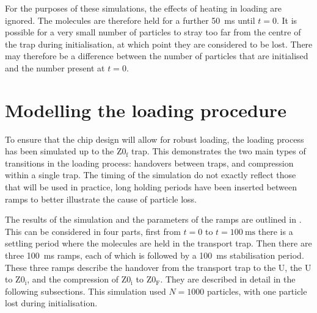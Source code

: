 For the purposes of these simulations, the effects of heating in loading
  are
ignored. The molecules are therefore held for a further \SI{50}{\milli\second}
until $t=0$. It is possible for a very small number of particles to stray too
far from the centre of the trap during initialisation, at which point they are
considered to be lost. There may therefore be a difference between the number
of particles that are initialised and the number present at $t=0$.

\section{Modelling the loading procedure}
\label{design:sim}

To ensure that the chip design will allow for robust loading, the loading
process has been simulated up to the $\mathrm{Z0_f}$ trap. This demonstrates
the two main types of transitions in the loading process: handovers between
traps, and compression within a single trap. The timing of the simulation do
not exactly reflect those that will be used in practice, long holding periods
have been inserted between ramps to better illustrate the cause of particle
loss.

The results of the simulation and the parameters of the ramps are outlined in
. This can be considered in four parts, first
from $t = 0$ to $t=\SI{100}{\milli\second}$ there is a settling period where
the molecules are held in the transport trap. Then there are three
\SI{100}{\milli\second} ramps, each of which is followed by a
\SI{100}{\milli\second} stabilisation period. These three ramps describe the
handover from the transport trap to the U, the U to $\mathrm{Z0_i}$, and the
compression of $\mathrm{Z0_i}$ to $\mathrm{Z0_F}$. They are described in detail
in the following subsections. This simulation used $N=1000$ particles, with one
particle lost during initialisation.

